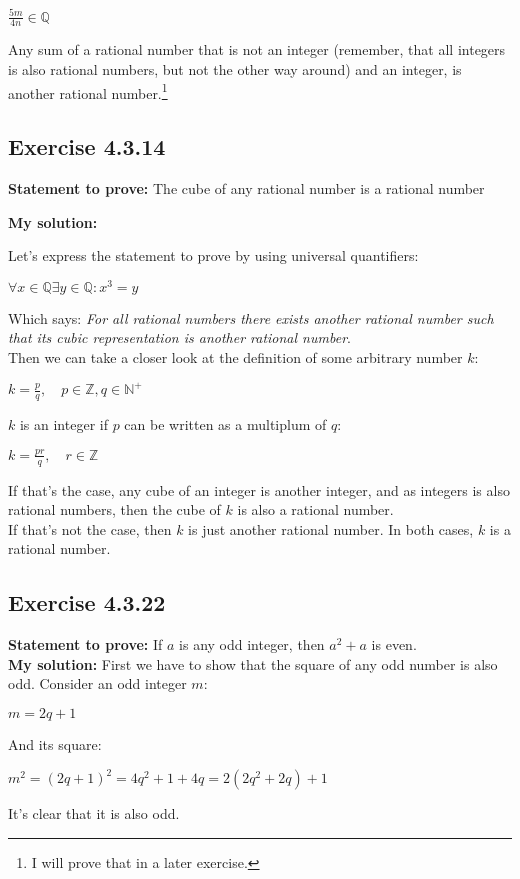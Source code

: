 \documentclass{report}
\newcommand{\cent}[1]{\begin{center}#1\end{center}}
\newcommand{\doubleZ}{\mathbb{Z}}
\newcommand{\doubleN}{\mathbb{N}}
\newcommand{\doubleQ}{\mathbb{Q}}
\newcommand{\In}{\! \in \!}
\newcommand{\Prove}{\textbf{Statement to prove: }}
\newcommand{\solution}{\textbf{My solution: }}
\newcommand{\QED}{\boxed{}}
\newcommand{\Exercise}[1]{\subsection{Exercise #1}}
\begin{document}
	\cent{$\frac{5m}{4n} \in \doubleQ$} 
	
	Any sum of a rational number that is not an integer (remember, that all integers is also rational numbers, but not the other way around) and an integer, is another rational number.\footnote{I will prove that in a later exercise.}\\
	\QED
	
	\Exercise{4.3.14}
	
	\Prove
	The cube of any rational number is a rational number
	
	\solution
	
	Let's express the statement to prove by using universal quantifiers:
	
	\cent{$\forall x \In \doubleQ \exists y \In \doubleQ : x^3 = y$}
	
	Which says: \textit{For all rational numbers there exists another rational number such that its cubic representation is another rational number}.\\
	
	Then we can take a closer look at the definition of some arbitrary number $k$:
	
	\cent{$k = \frac{p}{q}, \quad p \In \doubleZ, q \In \doubleN^+$}
	
	$k$ is an integer if $p$ can be written as a multiplum of $q$:
	
	\cent{$k = \frac{pr}{q}, \quad r \In \doubleZ$}
	
	If that's the case, any cube of an integer is another integer, and as integers is also rational numbers, then the cube of $k$ is also a rational number.\\
	
	If that's not the case, then $k$ is just another rational number. In both cases, $k$ is a rational number.\\
	\QED
	
	\Exercise{4.3.22}
	
	\Prove
	If $a$ is any odd integer, then $a^2 + a$ is even.\\
	
	\solution
	First we have to show that the square of any odd number is also odd. Consider an odd integer $m$:
	
	\cent{$m = 2q + 1$}
	
	And its square:
	
	\cent{$m^2 = (2q+1)^2 = 4q^2+1+4q = 2(2q^2 + 2q) + 1$}
	
	It's clear that it is also odd.\\
	
\end{document}

